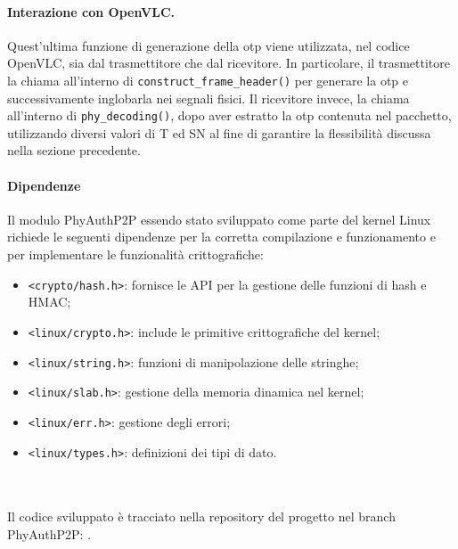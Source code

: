 \paragraph{Interazione con OpenVLC.}
Quest'ultima funzione di generazione della \gls{otp} viene utilizzata, nel codice OpenVLC, sia dal trasmettitore che dal ricevitore.
In particolare, il trasmettitore la chiama all'interno di \texttt{construct\_frame\_header()} per generare la \gls{otp} e successivamente inglobarla nei segnali fisici. Il ricevitore invece, la chiama all'interno di \texttt{phy\_decoding()}, dopo aver estratto la \gls{otp} contenuta nel pacchetto, utilizzando diversi valori di T ed SN al fine di garantire la flessibilità discussa nella sezione precedente.

\paragraph{Dipendenze}
Il modulo PhyAuthP2P essendo stato sviluppato come parte del kernel Linux richiede le seguenti dipendenze per la corretta compilazione e funzionamento e per implementare le funzionalità crittografiche:
\begin{itemize}
    \item \texttt{<crypto/hash.h>}: fornisce le API per la gestione delle funzioni di hash e HMAC;
    \item \texttt{<linux/crypto.h>}: include le primitive crittografiche del kernel;
    \item \texttt{<linux/string.h>}: funzioni di manipolazione delle stringhe;
    \item \texttt{<linux/slab.h>}: gestione della memoria dinamica nel kernel;
    \item \texttt{<linux/err.h>}: gestione degli errori;
    \item \texttt{<linux/types.h>}: definizioni dei tipi di dato.\\\\\\
\end{itemize}

\noindent Il codice sviluppato è tracciato nella repository del progetto nel branch PhyAuthP2P: \cite{site:openvlc-pa-github}.
